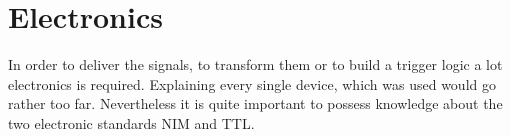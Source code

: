 \documentclass[british,11pt,a4paper]{memoir}
\begin{document}
\section{Electronics}
In order to deliver the signals, to transform them or to build a trigger logic a lot electronics is required. Explaining every single device, which was used would go rather too far. Nevertheless it is quite important to possess knowledge about the two electronic standards NIM and \ac{TTL}.
\end{document}
